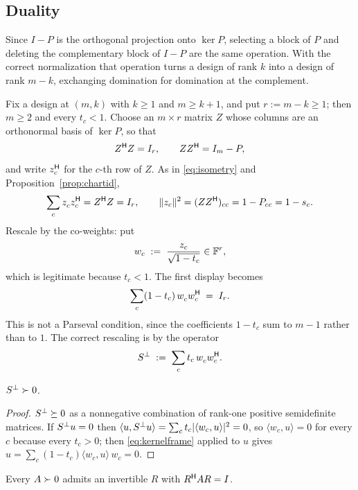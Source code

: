 \subsection{Duality}\label{sec:duality}

Since $I-P$ is the orthogonal projection onto $\ker P$, selecting a block
of $P$ and deleting the complementary block of $I-P$ are the same
operation.  With the correct normalization that operation turns a design
of rank $k$ into a design of rank $m-k$, exchanging domination for
domination at the complement.

Fix a design at $(m,k)$ with $k\ge1$ and $m\ge k+1$, and put $r:=m-k\ge1$;
then $m\ge2$ and every $t_c<1$.  Choose an $m\times r$ matrix $Z$ whose
columns are an orthonormal basis of $\ker P$, so that
\[
  Z^{\mathsf{H}} Z=I_r,\qquad ZZ^{\mathsf{H}}=I_m-P ,
\]
and write $z_c^{\mathsf{H}}$ for the $c$-th row of $Z$.  As in
\eqref{eq:isometry} and Proposition~\ref{prop:chartid},
\[
  \sum_c z_c^{\vphantom{\mathsf{H}}}z_c\adj=Z\adj Z=I_r,
  \qquad
  \lVert z_c\rVert^2=(ZZ\adj)_{cc}=1-P_{cc}=1-s_c .
\]
Rescale by the co-weights: put
\[
  w_c\;:=\;\frac{z_c}{\sqrt{1-t_c}}\in\mathbb{F}^{r},
\]
which is legitimate because $t_c<1$.  The first display becomes
\begin{equation}\label{eq:kernelframe}
  \sum_c(1-t_c)\,w_c^{\vphantom{\mathsf{H}}}w_c\adj\;=\;I_r .
\end{equation}
This is not a Parseval condition, since the coefficients $1-t_c$ sum to
$m-1$ rather than to $1$.  The correct rescaling is by the operator
\begin{equation}\label{eq:dualgram}
  \Sdual\;:=\;\sum_c t_c\,w_c^{\vphantom{\mathsf{H}}}w_c\adj .
\end{equation}

\begin{lemma}\label{lem:dualgram}
$S^{\perp}\succ0$.
\end{lemma}

\begin{proof}
$S^{\perp}\succeq0$ as a nonnegative combination of rank-one positive semidefinite
matrices.  If $S^{\perp} u=0$ then $\langle u,S^{\perp} u\rangle=\sum_ct_c\lvert\langle
w_c,u\rangle\rvert^2=0$, so $\langle w_c,u\rangle=0$ for every $c$
because every $t_c>0$; then \eqref{eq:kernelframe} applied to $u$ gives
$u=\sum_c(1-t_c)\langle w_c,u\rangle\,w_c=0$.
\end{proof}

\begin{lemma}[Lean]\label{lem:whiten}
Every $A\succ0$ admits an invertible $R$ with $R^{\mathsf{H}} AR=I$.
\end{lemma}

